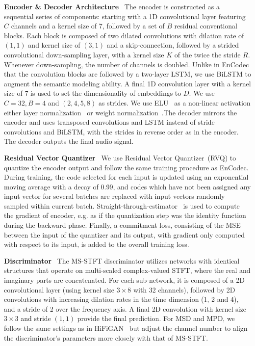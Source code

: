 
\textbf{Encoder \& Decoder Architecture}~
The encoder is constructed as a sequential series of components: starting with a 1D convolutional layer featuring $C$ channels and a kernel size of 7, followed by a set of $B$ residual conventional blocks. Each block is composed of two dilated convolutions with dilation rate of $(1,1)$ and kernel size of $(3,1)$ and a skip-connection, followed by a strided convolutional down-sampling layer, with a kernel size $K$ of the twice the stride $R$. Whenever down-sampling, the number of channels is doubled. Unlike in EnCodec that the convolution blocks are followed by a two-layer LSTM, we use BiLSTM to augment the semantic modeling ability. A final 1D convolution layer with a kernel size of 7 is used to set the dimensionality of embeddings to $D$. We use $C=32,B=4$ and $(2,4,5,8)$ as strides. We use ELU~\citep{clevert2016fast} as a non-linear activation either layer normalization~\citep{ba2016layer} or weight normalization~\citep{salimans2016weight}.The decoder mirrors the encoder and uses transposed convolutions and LSTM instead of stride convolutions and BiLSTM, with the strides in reverse order as in the encoder. The decoder outputs the final audio signal.

\textbf{Residual Vector Quantizer}~
We use Residual Vector Quantizer~(RVQ) to quantize the encoder output and follow the same training procedure as EnCodec. During training, the code selected for each input is updated using an exponential moving average with a decay of 0.99, and codes which have not been assigned any input vector for several batches are replaced with input vectors randomly sampled within current batch. Straight-through-estimator~\citep{bengio2013estimating} is used to compute the gradient of encoder, e.g. as if the quantization step was the identity function during the backward phase. Finally, a commitment loss, consisting of the MSE between the input of the quantizer and its output, with gradient only computed with respect to its input, is added to the overall training loss.

\textbf{Discriminator}~
The MS-STFT discriminator utilizes networks with identical structures that operate on multi-scaled complex-valued STFT, where the real and imaginary parts are concatenated. For each sub-network, it is composed of a 2D convolutional layer (using kernel size $3\times8$ with 32 channels), followed by 2D convolutions with increasing dilation rates in the time dimension (1, 2 and 4), and a stride of 2 over the frequency axis. A final 2D convolution with kernel size $3\times3$ and stride $(1, 1)$ provide the final prediction. For MSD and MPD, we follow the same settings as in HiFiGAN~\citep{kong2020hifi} but adjust the channel number to align the discriminator's parameters more closely with that of MS-STFT.